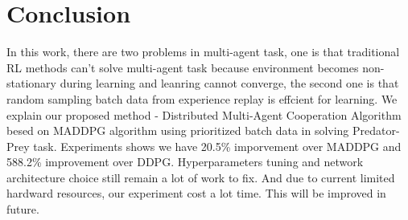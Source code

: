 \documentclass[11pt,twocolumn]{jarticle} %
\begin{document}
\section{Conclusion}
In this work, there are two problems in multi-agent task, one is that traditional RL methods can't solve multi-agent task because environment becomes non-stationary during learning and leanring cannot converge, the second one is that random sampling batch data from experience replay is effcient for learning. We explain our proposed method - Distributed Multi-Agent Cooperation Algorithm besed on MADDPG algorithm using prioritized batch data in solving Predator-Prey task. Experiments shows we have 20.5\% imporvement over MADDPG and 588.2\% improvement over DDPG.
Hyperparameters tuning and network architecture choice still remain a lot of work to fix.
And due to current limited hardward resources, our experiment cost a lot time. This will be improved in future.


\end{document}
